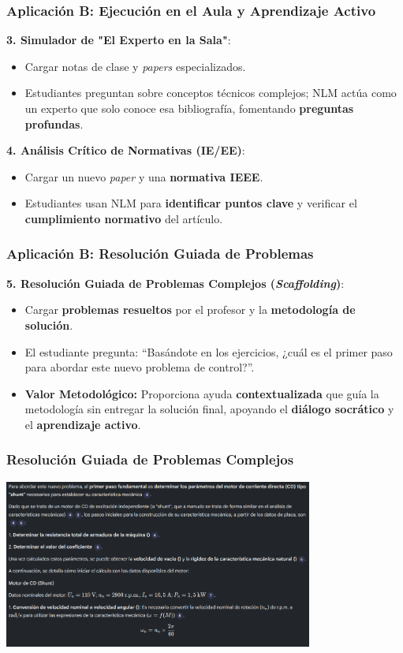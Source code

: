 \documentclass[aspectratio=43]{beamer}
\begin{document}
\begin{frame}
\frametitle{ Aplicación B: Ejecución en el Aula y Aprendizaje Activo}

\textbf{3. Simulador de "El Experto en la Sala"}:
\begin{itemize}
    \item Cargar notas de clase y \textit{papers} especializados.
    \item Estudiantes preguntan sobre conceptos técnicos complejos; NLM actúa como un experto que solo conoce esa bibliografía, fomentando \textbf{preguntas profundas}.
\end{itemize}

\textbf{4. Análisis Crítico de Normativas (IE/EE)}:
\begin{itemize}
    \item Cargar un nuevo \textit{paper} y una \textbf{normativa IEEE}.
    \item Estudiantes usan NLM para \textbf{identificar puntos clave} y verificar el \textbf{cumplimiento normativo} del artículo.
\end{itemize}
\end{frame}

\begin{frame}
\frametitle{ Aplicación B: Resolución Guiada de Problemas}

\textbf{5. Resolución Guiada de Problemas Complejos (\textit{Scaffolding})}:
\begin{itemize}
    \item Cargar \textbf{problemas resueltos} por el profesor y la \textbf{metodología de solución}.
    \item El estudiante pregunta: “Basándote en los ejercicios, ¿cuál es el primer paso para abordar este nuevo problema de control?”.
    \item \textbf{Valor Metodológico:} Proporciona ayuda \textbf{contextualizada} que guía la metodología sin entregar la solución final, apoyando el \textbf{diálogo socrático} y el \textbf{aprendizaje activo}.
\end{itemize}
\end{frame}

\begin{frame}
  \frametitle{Resolución Guiada de Problemas Complejos}
  \begin{center}
    \includegraphics[width=4in]{solucion.png}
  \end{center}
\end{frame}
\end{document}
